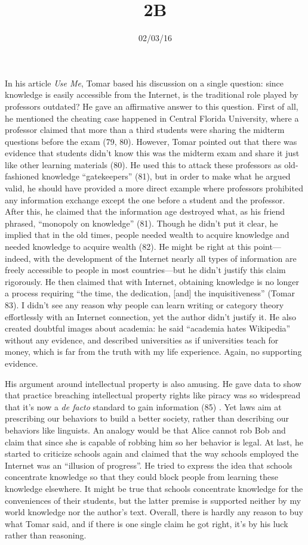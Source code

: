 \documentclass{writing}
\title{2B}
\date{02/03/16}
\begin{document}
\maketitle

In his article \emph{Use Me}, Tomar based his discussion on a single
question: since knowledge is easily accessible from the Internet, is the
traditional role played by professors outdated? He gave an affirmative
answer to this question. First of all, he mentioned the cheating case
happened in Central Florida University, where a professor claimed that
more than a third students were sharing the midterm questions before the
exam (79, 80). However, Tomar pointed out that there was evidence that
students didn't know this was the midterm exam and share it just like
other learning materials (80). He used this to attack these professors
as old-fashioned knowledge ``gatekeepers'' (81), but in order to make
what he argued valid, he should have provided a more direct example
where professors prohibited any information exchange except the one
before a student and the professor. After this, he claimed that the
information age destroyed what, as his friend phrased, ``monopoly on
knowledge'' (81). Though he didn't put it clear, he implied that in the
old times, people needed wealth to acquire knowledge and needed
knowledge to acquire wealth (82). He might be right at this
point---indeed, with the development of the Internet nearly all types of
information are freely accessible to people in most countries---but he
didn't justify this claim rigorously. He then claimed that with
Internet, obtaining knowledge is no longer a process requiring ``the
time, the dedication, {[}and{]} the inquisitiveness'' (Tomar 83). I
didn't see any reason why people can learn writing or category theory
effortlessly with an Internet connection, yet the author didn't justify
it. He also created doubtful images about academia: he said ``academia
hates Wikipedia'' without any evidence, and described universities as if
universities teach for money, which is far from the truth with my life
experience. Again, no supporting evidence.

His argument around intellectual property is also amusing. He gave data
to show that practice breaching intellectual property rights like piracy
was so widespread that it's now a \emph{de facto} standard to gain
information (85) . Yet laws aim at prescribing our behaviors to build a
better society, rather than describing our behaviors like linguists. An
analogy would be that Alice cannot rob Bob and claim that since she is
capable of robbing him so her behavior is legal. At last, he started to
criticize schools again and claimed that the way schools employed the
Internet was an ``illusion of progress''. He tried to express the idea
that schools concentrate knowledge so that they could block people from
learning these knowledge elsewhere. It might be true that schools
concentrate knowledge for the conveniences of their students, but the
latter premise is supported neither by my world knowledge nor the
author's text. Overall, there is hardly any reason to buy what Tomar
said, and if there is one single claim he got right, it's by his luck
rather than reasoning.
\end{document}
